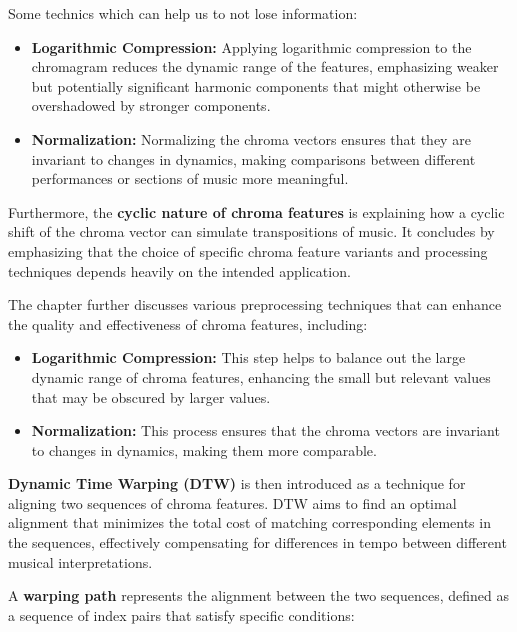 \documentclass[a4paper, 9pt, twocolumn]{extarticle}
\begin{document}
    Some technics which can help us to not lose information:
    
\begin{itemize}
    \item
      \textbf{Logarithmic Compression:} Applying logarithmic compression to
      the chromagram reduces the dynamic range of the features, emphasizing
      weaker but potentially significant harmonic components that might
      otherwise be overshadowed by stronger components.
    \item
      \textbf{Normalization:} Normalizing the chroma vectors ensures that
      they are invariant to changes in dynamics, making comparisons between
      different performances or sections of music more meaningful.
    \end{itemize}
    
    Furthermore, the \textbf{cyclic nature of chroma features} is explaining
    how a cyclic shift of the chroma vector can simulate transpositions of
    music. It concludes by emphasizing that the choice of specific chroma
    feature variants and processing techniques depends heavily on the
    intended application.
    
    The chapter further discusses various preprocessing techniques that can
    enhance the quality and effectiveness of chroma features, including:
    
    \begin{itemize}
    \item
      \textbf{Logarithmic Compression:} This step helps to balance out the
      large dynamic range of chroma features, enhancing the small but
      relevant values that may be obscured by larger values.
    \item
      \textbf{Normalization:} This process ensures that the chroma vectors
      are invariant to changes in dynamics, making them more comparable.
    \end{itemize}
    
    \textbf{Dynamic Time Warping (DTW)} is then introduced as a technique
    for aligning two sequences of chroma features. DTW aims to find an
    optimal alignment that minimizes the total cost of matching
    corresponding elements in the sequences, effectively compensating for
    differences in tempo between different musical interpretations.
    
    A \textbf{warping path} represents the alignment between the two
    sequences, defined as a sequence of index pairs that satisfy specific
    conditions:
    
\end{document}
